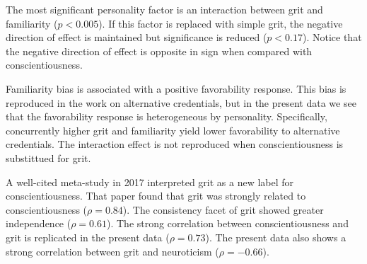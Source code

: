 \documentclass[review]{elsarticle}
\begin{document}
The most significant personality factor is an interaction between grit and familiarity ($p<0.005$).
If this factor is replaced with simple grit,
the negative direction of effect is maintained but significance is reduced ($p<0.17$).
Notice that the negative direction of effect is opposite in sign when compared with conscientiousness.

Familiarity bias is associated with a positive favorability response.
This bias is reproduced in the work on alternative credentials,
but in the present data we see that the favorability response is heterogeneous by personality.
Specifically, concurrently higher grit and familiarity yield lower favorability to alternative credentials.
The interaction effect is not reproduced when conscientiousness is substittued for grit.

A well-cited meta-study in 2017 interpreted grit as a new label for conscientiousness\cite{schmidt2018same}.
That paper found that grit was strongly related to conscientiousness ($\rho = 0.84$).
The consistency facet of grit showed greater independence ($\rho = 0.61$).
The strong correlation between conscientiousness and grit is replicated in the present data ($\rho = 0.73$).
The present data also shows a strong correlation between grit and neuroticism ($\rho = -0.66$).

\end{document}
